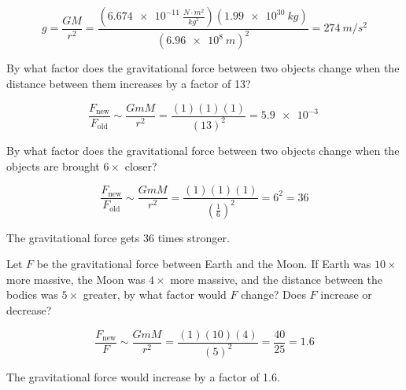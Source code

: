 \documentclass{exam}
\begin{document}
\begin{questions}
\begin{parts}
\begin{solution}

\begin{equation*}
    g = \frac{G M}{r^2} = \frac{(\SI{6.674e-11}{\frac{N \cdot m^2}{kg^2}})(\SI{1.99e30}{kg})}{(\SI{6.96e8}{m})^2} = \SI{274}{m/s^2} 
\end{equation*}
\end{solution}
\end{parts}

\question
By what factor does the gravitational force between two objects change when the distance between them increases by a factor of 13?

\begin{solution}

\begin{equation*}
    \frac{F_{\text{new}}}{F_{\text{old}}} \sim \frac{G m M}{r^2} = \frac{(1)(1)(1)}{(13)^2} = \SI{5.9e-3}{} 
\end{equation*}
\end{solution}

\question
By what factor does the gravitational force between two objects change when the objects are brought $6 \times$ closer?

\begin{solution}

\begin{equation*}
    \frac{F_{\text{new}}}{F_{\text{old}}} \sim \frac{G m M}{r^2} = \frac{(1)(1)(1)}{\left(\frac{1}{6}\right)^2} = 6^2 = 36
\end{equation*}

The gravitational force gets 36 times stronger.
\end{solution}

\question
Let $F$ be the gravitational force between Earth and the Moon. If Earth was $10 \times$ more massive, the Moon was $4 \times$ more massive, and the distance between the bodies was $5 \times$ greater, by what factor would $F$ change? Does $F$ increase or decrease? 

\begin{solution}

\begin{equation*}
    \frac{F_{\text{new}}}{F} \sim \frac{G m M}{r^2} = \frac{(1)(10)(4)}{(5)^2} = \frac{40}{25} = 1.6
\end{equation*}

The gravitational force would increase by a factor of 1.6.
\end{solution}


\end{questions}
\end{document}
